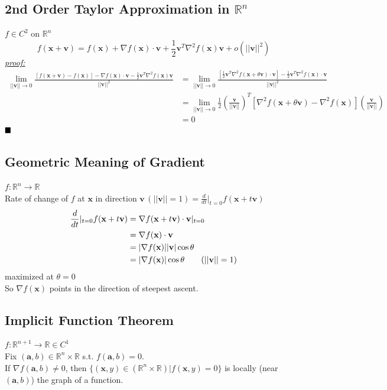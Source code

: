 \documentclass[11pt]{article}
\newcommand{\tb}[1]{\textbf{#1}}
\newcommand{\real}[0]{\mathbb{R}}
\newcommand{\proof}[0]{\textit{\underline{proof:} }}
\newcommand{\vx}[0]{\tb{x}}
\newcommand{\va}[0]{\tb{a}}
\newcommand{\vv}[0]{\tb{v}}
\newcommand{\qed}[0]{$\hfill\blacksquare$}
\begin{document}
\subsection{2nd Order Taylor Approximation in $\real^n$}
$f \in C^2$ on $\real^n$ \\
$$f(\vx + \vv) = f(\vx) + \nabla f(\vx) \cdot \vv + \frac{1}{2}\vv^T\nabla^2 f(\vx) \vv + o(||\vv||^2)$$
\proof \\
\begin{align*}
	\underset{||\vv|| \rightarrow 0}{\lim} \frac{[f(\vx + \vv) - f(\vx)] - \nabla f(\vx)\cdot \vv - \frac{1}{2} \vv^T \nabla^2 f(\vx)\vv}{||\vv||^2} 
	&= \underset{||\vv|| \rightarrow 0}{\lim} \frac{[\frac{1}{2}\vv^T\nabla^2 f(\vx + \theta \vv) \cdot \vv] - \frac{1}{2}\vv^T\nabla^2 f(\vx) \cdot \vv}{||\vv||^2} \tag{By 2nd MVT}\\
	&=  \underset{||\vv|| \rightarrow 0}{\lim} \frac{1}{2}(\frac{\vv}{||\vv||})^T[\nabla^2 f(\vx + \theta \vv) - \nabla^2 f(\vx)](\frac{\vv}{||\vv||}) \\
	&= 0
\end{align*}
\qed 
\subsection{Geometric Meaning of Gradient}
$f: \real^n \rightarrow \real$\\
Rate of change of $f$ at $\vx$ in direction $\vv \, (||\vv||=1) = \frac{d}{dt}|_{t=0}f(\vx + t\vv)$
\begin{align*}
	\frac{d}{dt}|_{t=0}f(\vx + t\vv) &= \nabla f(\vx + t\vv) \cdot \vv |_{t=0} \\
	&= \nabla f(\vx)\cdot \vv \\
	&= |\nabla f(\vx)| |\vv| \cos \theta\\
	&= |\nabla f(\vx)| \cos \theta \tag{$||\vv||  = 1$}
\end{align*}
maximized at $\theta = 0$ \\
So $\nabla f(\vx)$ points in the direction of steepest ascent.

\subsection{Implicit Function Theorem}
$f: \real^{n+1} \rightarrow \real \in C^1$ \\
Fix $(\va,b) \in \real^n \times \real$ s.t. $f(\va,b) = 0$. \\
If $\nabla f(\va,b) \neq 0$, then $\{(\vx, y) \in (\real^n \times \real) | f(\vx, y) = 0\}$ is locally (near $(\va, b)$) the graph of a function.
\end{document}
